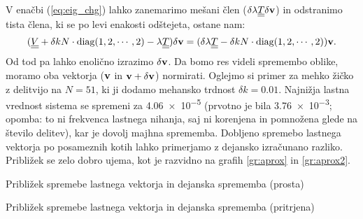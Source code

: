\documentclass{article}
\begin{document}
V enačbi (\ref{eq:eig_chg}) lahko zanemarimo mešani člen ($\delta\lambda\underline{\underline{T}}\delta\mathbf{v}$) in odstranimo tista člena, ki se po levi enakosti odštejeta, ostane nam:
\begin{equation}
    (\underline{\underline{V}}+\delta k N\cdot\text{diag}(1,2,\cdots,2)-\lambda\underline{\underline{T}})\delta\mathbf{v}=(\delta\lambda\underline{\underline{T}}-\delta k N\cdot\text{diag}(1,2,\cdots,2))\mathbf{v}.
\end{equation}
Od tod pa lahko enolično izrazimo $\delta\mathbf{v}$. Da bomo res videli spremembo oblike, moramo oba vektorja ($\mathbf{v}$ in $\mathbf{v}+\delta\mathbf{v}$) normirati.
Oglejmo si primer za mehko žičko z delitvijo na $N=51$, ki ji dodamo mehansko trdnost $\delta k=\num{0,01}$. Najnižja lastna vrednost sistema se spremeni za \num{4,06e-5} (prvotno je bila \num{3,76e-3}; opomba: to ni frekvenca lastnega nihanja, saj ni korenjena in pomnožena glede na število delitev), kar je dovolj majhna sprememba. Dobljeno spremebo lastnega vektorja po posameznih kotih lahko primerjamo z dejansko izračunano razliko. Približek se zelo dobro ujema, kot je razvidno na grafih \ref{gr:aprox} in \ref{gr:aprox2}.\\
\begin{minipage}{0.5\textwidth}
    \begin{graph}[H]
        \centering
        
        \caption{Približek spremebe lastnega vektorja in dejanska sprememba (prosta)}
        \label{gr:aprox}
    \end{graph}
\end{minipage}
\begin{minipage}{0.5\textwidth}
    \begin{graph}[H]
        \centering
        
        \caption{Približek spremebe lastnega vektorja in dejanska sprememba (pritrjena)}
        \label{gr:aprox2}
    \end{graph}
\end{minipage}\\
\end{document}
